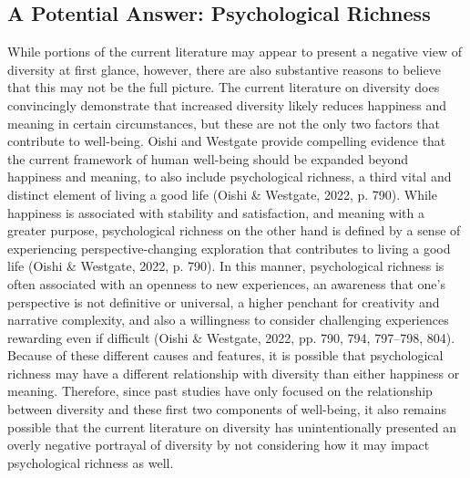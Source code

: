 \documentclass[
  man,floatsintext]{apa7}
\begin{document}
\hypertarget{a-potential-answer-psychological-richness}{%
\subsection{A Potential Answer: Psychological Richness}\label{a-potential-answer-psychological-richness}}

While portions of the current literature may appear to present a negative view of diversity at first glance, however, there are also substantive reasons to believe that this may not be the full picture. The current literature on diversity does convincingly demonstrate that increased diversity likely reduces happiness and meaning in certain circumstances, but these are not the only two factors that contribute to well-being. Oishi and Westgate provide compelling evidence that the current framework of human well-being should be expanded beyond happiness and meaning, to also include psychological richness, a third vital and distinct element of living a good life (Oishi \& Westgate, 2022, p. 790). While happiness is associated with stability and satisfaction, and meaning with a greater purpose, psychological richness on the other hand is defined by a sense of experiencing perspective-changing exploration that contributes to living a good life (Oishi \& Westgate, 2022, p. 790). In this manner, psychological richness is often associated with an openness to new experiences, an awareness that one's perspective is not definitive or universal, a higher penchant for creativity and narrative complexity, and also a willingness to consider challenging experiences rewarding even if difficult (Oishi \& Westgate, 2022, pp. 790, 794, 797--798, 804). Because of these different causes and features, it is possible that psychological richness may have a different relationship with diversity than either happiness or meaning. Therefore, since past studies have only focused on the relationship between diversity and these first two components of well-being, it also remains possible that the current literature on diversity has unintentionally presented an overly negative portrayal of diversity by not considering how it may impact psychological richness as well.
\end{document}
